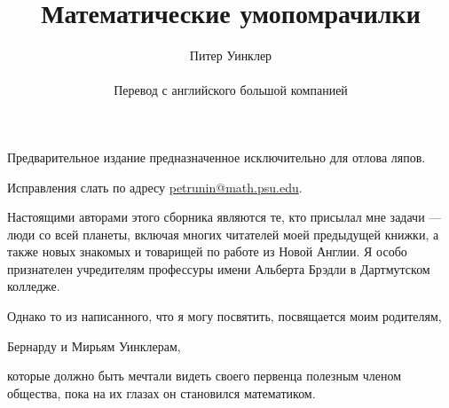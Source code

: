 \documentclass[twoside]{book}
\def\thetitle{Математические умопомрачилки} %
\def\theauthor{Питер Уинклер}
\begin{document}

\title{\thetitle}
\author{\theauthor\\
\\
Перевод с английского большой компанией}
\date{}
\maketitle

\thispagestyle{empty}

Предварительное издание предназначенное исключительно для отлова ляпов. 

Исправления слать по адресу 
\url{petrunin@math.psu.edu}.

\vfill

\pagebreak

Настоящими авторами этого сборника являются те, кто присылал мне задачи --- люди со всей планеты, включая многих читателей моей предыдущей книжки, а также новых знакомых и товарищей по работе из Новой Англии.
Я особо признателен учредителям профессуры имени Альберта Брэдли в Дартмутском колледже.

Однако то из написанного, что я могу посвятить, посвящается моим родителям,
\begin{center}
Бернарду и Мирьям Уинклерам,
\end{center}
которые должно быть мечтали видеть своего первенца полезным членом общества, пока на их глазах он становился математиком.

\thispagestyle{empty}






















\appendix

{
\small

\printindex

}

{

\sloppy

\printbibliography[heading=bibintoc]


\fussy

}

\newpage

{
\small

\printindex

}


\newpage

{

\tableofcontents

}
\end{document}
